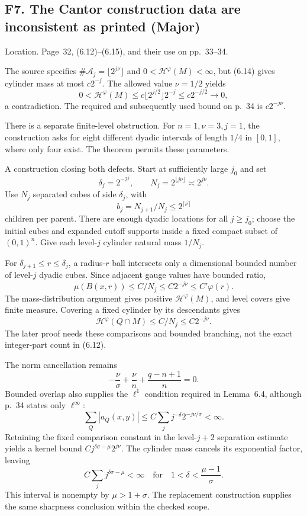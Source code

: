 \documentclass[10pt]{article}
\begin{document}
\subsection*{F7. The Cantor construction data are inconsistent as printed (Major)}
Location. Page 32, (6.12)–(6.15), and their use on pp. 33–34.\par
The source specifies \(\#\mathcal A_j=\lfloor2^{j\nu}\rfloor\) and \(0<\mathcal H^\varphi(M)<\infty\), but (6.14) gives cylinder mass at most \(c2^{-j}\). The allowed value \(\nu=1/2\) yields \[0<\mathcal H^\varphi(M)
 \le c\lfloor2^{j/2}\rfloor2^{-j}
 \le c2^{-j/2}\longrightarrow0,\] a contradiction. The required and subsequently used bound on p. 34 is \(c2^{-j\nu}\).\par
There is a separate finite-level obstruction. For \(n=1,\nu=3,j=1\), the construction asks for eight different dyadic intervals of length \(1/4\) in \([0,1]\), where only four exist. The theorem permits these parameters.\par
A construction closing both defects. Start at sufficiently large \(j_0\) and set \[\delta_j=2^{-2^j},\qquad N_j=2^{\lfloor j\nu\rfloor}\asymp2^{j\nu}.\] Use \(N_j\) separated cubes of side \(\delta_j\), with \[b_j=N_{j+1}/N_j\le2^{\lceil\nu\rceil}\] children per parent. There are enough dyadic locations for all \(j\ge j_0\); choose the initial cubes and expanded cutoff supports inside a fixed compact subset of \((0,1)^n\). Give each level-\(j\) cylinder natural mass \(1/N_j\).\par
For \(\delta_{j+1}\le r\le\delta_j\), a radius-\(r\) ball intersects only a dimensional bounded number of level-\(j\) dyadic cubes. Since adjacent gauge values have bounded ratio, \[\mu(B(x,r))\le C/N_j\le C2^{-j\nu}\le C'\varphi(r).\] The mass-distribution argument gives positive \(\mathcal H^\varphi(M)\), and level covers give finite measure. Covering a fixed cylinder by its descendants gives \[\mathcal H^\varphi(Q\cap M)\le C/N_j\le C2^{-j\nu}.\] The later proof needs these comparisons and bounded branching, not the exact integer-part count in (6.12).\par
The norm cancellation remains \[-\frac{\nu}{\sigma}+\frac{\nu}{n}
       +\frac{q-n+1}{n}=0.\] Bounded overlap also supplies the \(\ell^1\) condition required in Lemma 6.4, although p. 34 states only \(\ell^\infty\): \[\sum_Q|a_Q(x,y)|
 \le C\sum_jj^{-\delta}2^{-j\nu/\sigma}<\infty.\] Retaining the fixed comparison constant in the level-\(j+2\) separation estimate yields a kernel bound \(Cj^{\delta\sigma-\mu}2^{j\nu}\). The cylinder mass cancels its exponential factor, leaving \[C\sum_jj^{\delta\sigma-\mu}<\infty
 \quad\text{for}\quad
 1<\delta<\frac{\mu-1}{\sigma}.\] This interval is nonempty by \(\mu>1+\sigma\). The replacement construction supplies the same sharpness conclusion within the checked scope.\par
\end{document}
